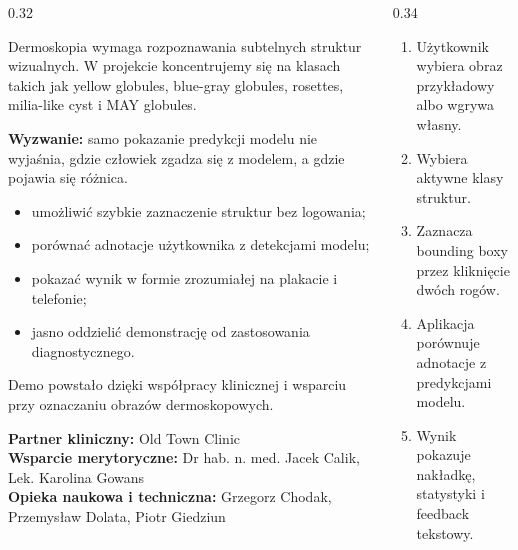 \documentclass[final]{beamer}
\newcommand{\sectioncard}[2]{
  \begin{tcolorbox}[medicalcard,title={#1}]
    \justifying
    #2
  \end{tcolorbox}
}
\begin{document}
\begin{frame}[t]
\vspace{1cm}

\begin{columns}[T,totalwidth=\textwidth]
  \begin{column}{0.32\textwidth}
    \sectioncard{Problem}{
      Dermoskopia wymaga rozpoznawania subtelnych struktur wizualnych.
      W projekcie koncentrujemy się na klasach takich jak yellow globules,
      blue-gray globules, rosettes, milia-like cyst i MAY globules.

      \vspace{0.4em}
      \textbf{Wyzwanie:} samo pokazanie predykcji modelu nie wyjaśnia, gdzie
      człowiek zgadza się z modelem, a gdzie pojawia się różnica.
    }

    \sectioncard{Cel demo}{
      \begin{itemize}
        \item umożliwić szybkie zaznaczenie struktur bez logowania;
        \item porównać adnotacje użytkownika z detekcjami modelu;
        \item pokazać wynik w formie zrozumiałej na plakacie i telefonie;
        \item jasno oddzielić demonstrację od zastosowania diagnostycznego.
      \end{itemize}
    }

    \sectioncard{Dane i współpraca}{
      Demo powstało dzięki współpracy klinicznej i wsparciu przy oznaczaniu
      obrazów dermoskopowych.

      \vspace{0.4em}
      \textbf{Partner kliniczny:} Old Town Clinic\\
      \textbf{Wsparcie merytoryczne:} Dr hab. n. med. Jacek Calik,
      Lek. Karolina Gowans\\
      \textbf{Opieka naukowa i techniczna:} Grzegorz Chodak,
      Przemysław Dolata, Piotr Giedziun
    }
  \end{column}

  \begin{column}{0.34\textwidth}
    \sectioncard{Przepływ użytkownika}{
      \begin{enumerate}
        \item Użytkownik wybiera obraz przykładowy albo wgrywa własny.
        \item Wybiera aktywne klasy struktur.
        \item Zaznacza bounding boxy przez kliknięcie dwóch rogów.
        \item Aplikacja porównuje adnotacje z predykcjami modelu.
        \item Wynik pokazuje nakładkę, statystyki i feedback tekstowy.
      \end{enumerate}
    }


\end{column}
\end{columns}
\end{frame}
\end{document}
